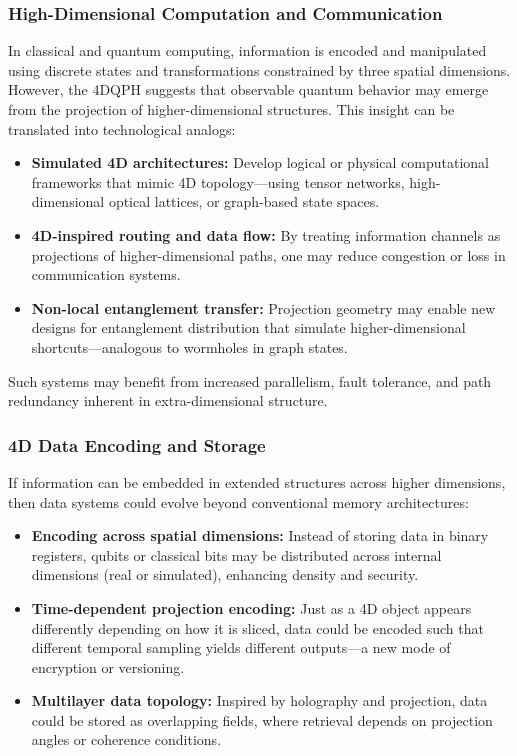 \documentclass[12pt]{article}
\begin{document}
\subsubsection*{High-Dimensional Computation and Communication}

In classical and quantum computing, information is encoded and manipulated using discrete states and transformations constrained by three spatial dimensions. However, the 4DQPH suggests that observable quantum behavior may emerge from the projection of higher-dimensional structures. This insight can be translated into technological analogs:

\begin{itemize}
    \item \textbf{Simulated 4D architectures:} Develop logical or physical computational frameworks that mimic 4D topology—using tensor networks, high-dimensional optical lattices, or graph-based state spaces.
    \item \textbf{4D-inspired routing and data flow:} By treating information channels as projections of higher-dimensional paths, one may reduce congestion or loss in communication systems.
    \item \textbf{Non-local entanglement transfer:} Projection geometry may enable new designs for entanglement distribution that simulate higher-dimensional shortcuts—analogous to wormholes in graph states.
\end{itemize}

Such systems may benefit from increased parallelism, fault tolerance, and path redundancy inherent in extra-dimensional structure.

\subsubsection*{4D Data Encoding and Storage}

If information can be embedded in extended structures across higher dimensions, then data systems could evolve beyond conventional memory architectures:

\begin{itemize}
    \item \textbf{Encoding across spatial dimensions:} Instead of storing data in binary registers, qubits or classical bits may be distributed across internal dimensions (real or simulated), enhancing density and security.
    \item \textbf{Time-dependent projection encoding:} Just as a 4D object appears differently depending on how it is sliced, data could be encoded such that different temporal sampling yields different outputs—a new mode of encryption or versioning.
    \item \textbf{Multilayer data topology:} Inspired by holography and projection, data could be stored as overlapping fields, where retrieval depends on projection angles or coherence conditions.
\end{itemize}
\end{document}

